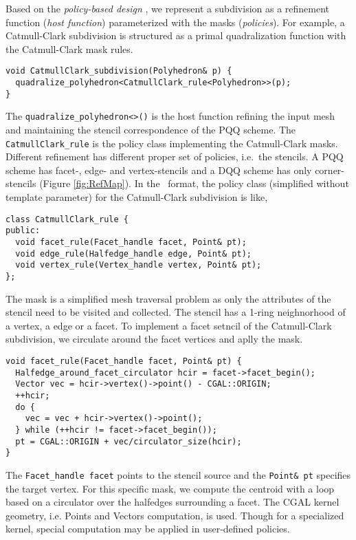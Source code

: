 Based on the \emph{policy-based design} \cite{a-rotm-02}, 
we represent a subdivision as a refinement function 
(\emph{host function}) parameterized with the masks
(\emph{policies}). For example, a Catmull-Clark subdivision
is structured as a primal quadralization function with the 
Catmull-Clark mask rules.
\begin{lstlisting}
void CatmullClark_subdivision(Polyhedron& p) {
  quadralize_polyhedron<CatmullClark_rule<Polyhedron>>(p);
}
\end{lstlisting}
The \lstinline!quadralize_polyhedron<>()! is the host function
refining the input mesh and maintaining the stencil 
correspondence of the PQQ scheme. The \lstinline!CatmullClark_rule!
is the policy class implementing the Catmull-Clark masks. 
Different refinement has different proper set of policies, 
i.e.\ the stencils. A PQQ scheme has facet-, edge- and vertex-stencils 
and a DQQ scheme has only corner-stencils (Figure \ref{fig:RefMap}).
In the \CC\ format, the policy class (simplified without template 
parameter) for the Catmull-Clark subdivision 
is like,
\begin{lstlisting}
class CatmullClark_rule {
public:
  void facet_rule(Facet_handle facet, Point& pt);
  void edge_rule(Halfedge_handle edge, Point& pt);
  void vertex_rule(Vertex_handle vertex, Point& pt);
};
\end{lstlisting}
The mask is a simplified mesh traversal problem as
only the attributes of the stencil need to be  
visited and collected. The stencil has a 1-ring 
neighnorhood of a vertex, a edge or a facet.
To implement a facet setncil of the 
Catmull-Clark subdivision, we circulate around 
the facet vertices and aplly the mask.
\begin{lstlisting}
void facet_rule(Facet_handle facet, Point& pt) {
  Halfedge_around_facet_circulator hcir = facet->facet_begin();
  Vector vec = hcir->vertex()->point() - CGAL::ORIGIN;
  ++hcir;
  do {
    vec = vec + hcir->vertex()->point();
  } while (++hcir != facet->facet_begin());
  pt = CGAL::ORIGIN + vec/circulator_size(hcir);
}
\end{lstlisting}
The \lstinline!Facet_handle facet! points to the stencil
source and the \lstinline!Point& pt! specifies the
target vertex. For this specific mask, we compute the
centroid with a loop based on a circulator over the halfedges
surrounding a facet. The CGAL kernel geometry, i.e. Points 
and Vectors computation, is used. Though for a specialized
kernel, special computation may be applied in user-defined
policies.
 
